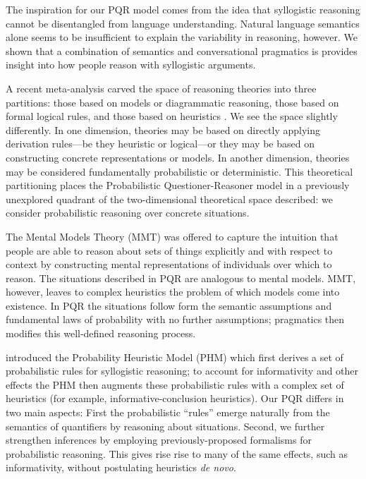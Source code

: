 \documentclass[10pt,letterpaper]{article}
\begin{document}
The inspiration for our PQR model comes from the idea that syllogistic reasoning cannot be disentangled from language understanding. Natural language semantics alone seems to be insufficient to explain the variability in reasoning, however. We shown that a combination of semantics and conversational pragmatics is provides insight into how people reason with syllogistic arguments. 

A recent meta-analysis carved the space of reasoning theories into three partitions: those based on models or diagrammatic reasoning, those based on formal logical rules, and those based on heuristics \cite{Khemlani2012}. We see the space slightly differently. In one dimension, theories may be based on directly applying derivation rules---be they heuristic or logical---or they may be based on constructing concrete representations or models. In another dimension, theories may be considered fundamentally probabilistic or deterministic. This theoretical partitioning places the Probabilistic Questioner-Reasoner model in a previously unexplored quadrant of the two-dimensional theoretical space described: we consider probabilistic reasoning over concrete situations.

The Mental Models Theory (MMT) was offered to capture the intuition that people are able to reason about sets of things explicitly and with respect to context by constructing mental representations of individuals over which to reason. The situations described in PQR are analogous to mental models. MMT, however, leaves to complex heuristics the problem of which models come into existence. In PQR the situations follow form the semantic assumptions and fundamental laws of probability with no further assumptions; pragmatics then modifies this well-defined reasoning process.

 introduced the Probability Heuristic Model (PHM) which first derives a set of probabilistic rules for syllogistic reasoning; to account for informativity and other effects the PHM then augments these probabilistic rules with a complex set of heuristics (for example, informative-conclusion heuristics). Our PQR differs in two main aspects: First the probabilistic ``rules'' emerge naturally from the semantics of quantifiers by reasoning about situations. Second, we further strengthen inferences by employing previously-proposed formalisms for probabilistic reasoning. This gives rise rise to many of the same effects, such as informativity, without postulating heuristics \emph{de novo}.
\end{document}
